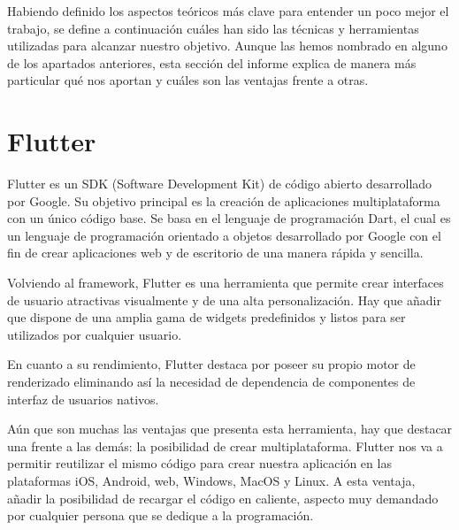 

	Habiendo definido los aspectos teóricos más clave para entender un poco mejor el trabajo, se define a continuación cuáles han sido las técnicas y herramientas utilizadas para alcanzar nuestro objetivo. Aunque las hemos nombrado en alguno de los apartados anteriores, esta sección del informe explica de manera más particular qué nos aportan y cuáles son las ventajas frente a otras.
	
\section{Flutter}

	Flutter es un SDK (Software Development Kit) de código abierto desarrollado por Google. Su objetivo principal es la creación de aplicaciones multiplataforma con un único código base. Se basa en el lenguaje de programación Dart, el cual es un lenguaje de programación orientado a objetos desarrollado por Google con el fin de crear aplicaciones web y de escritorio de una manera rápida y sencilla.
	
	Volviendo al framework, Flutter es una herramienta que permite crear interfaces de usuario atractivas visualmente y de una alta personalización. Hay que añadir que dispone de una amplia gama de widgets predefinidos y listos para ser utilizados por cualquier usuario.
	
	En cuanto a su rendimiento, Flutter destaca por poseer su propio motor de renderizado eliminando así la necesidad de dependencia de componentes de interfaz de usuarios nativos.
	
	Aún que son muchas las ventajas  que presenta esta herramienta, hay que destacar una frente a las demás: la posibilidad de crear multiplataforma. Flutter nos va a permitir reutilizar el mismo código para crear nuestra aplicación en las plataformas iOS, Android, web, Windows, MacOS y Linux. A esta ventaja, añadir la posibilidad de recargar el código en caliente, aspecto muy demandado por cualquier persona que se dedique a la programación.
	
